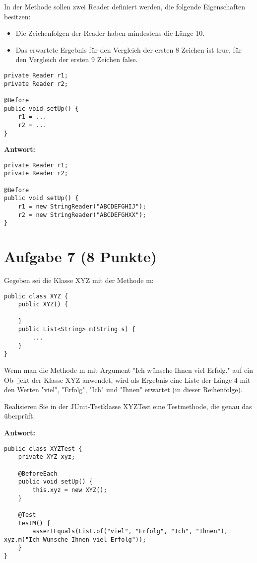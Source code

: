 In der Methode sollen zwei Reader definiert werden, die folgende Eigenschaften
besitzen:

\begin{itemize}
    \item Die Zeichenfolgen der Reader haben mindestens die Länge 10.
    \item Das erwartete Ergebnis für den Vergleich der ersten 8 Zeichen ist true, für den
          Vergleich der ersten 9 Zeichen false.
\end{itemize}

\begin{lstlisting}
private Reader r1;
private Reader r2;

@Before
public void setUp() {
    r1 = ...
    r2 = ...
}
\end{lstlisting}

\textbf{Antwort:}

\begin{lstlisting}
private Reader r1;
private Reader r2;

@Before
public void setUp() {
    r1 = new StringReader("ABCDEFGHIJ");
    r2 = new StringReader("ABCDEFGHXX");
}
\end{lstlisting}

\section{Aufgabe 7 (8 Punkte)}
Gegeben sei die Klasse XYZ mit der Methode m:

\begin{lstlisting}
public class XYZ {
    public XYZ() {
    
    }
    public List<String> m(String s) {
        ...
    }
}
\end{lstlisting}

Wenn man die Methode m mit Argument "Ich wünsche Ihnen viel Erfolg." auf ein
Ob- jekt der Klasse XYZ anwendet, wird als Ergebnis eine Liste der Länge 4 mit
den Werten "viel", "Erfolg", "Ich" und "Ihnen" erwartet (in dieser
Reihenfolge).

Realisieren Sie in der JUnit-Testklasse XYZTest eine Testmethode, die genau das
überprüft.

\textbf{Antwort:}

\begin{lstlisting}
public class XYZTest {
    private XYZ xyz;

    @BeforeEach
    public void setUp() {
        this.xyz = new XYZ();
    }

    @Test
    testM() {
        assertEquals(List.of("viel", "Erfolg", "Ich", "Ihnen"), xyz.m("Ich Wünsche Ihnen viel Erfolg"));
    }
}
\end{lstlisting}


